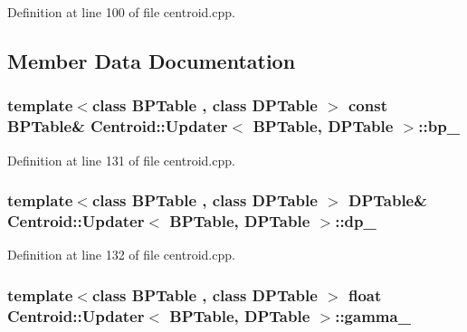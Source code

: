 Definition at line 100 of file centroid.\+cpp.



\subsection{Member Data Documentation}
\hypertarget{struct_centroid_1_1_updater_a9769d7141589366c4e6d031b267c8dc4}{
\subsubsection[{bp\+\_\+}]{\setlength{\rightskip}{0pt plus 5cm}template$<$class B\+P\+Table , class D\+P\+Table $>$ const {\bf B\+P\+Table}\& {\bf Centroid\+::\+Updater}$<$ {\bf B\+P\+Table}, D\+P\+Table $>$\+::bp\+\_\+}}\label{struct_centroid_1_1_updater_a9769d7141589366c4e6d031b267c8dc4}


Definition at line 131 of file centroid.\+cpp.

\hypertarget{struct_centroid_1_1_updater_ad9d56e0acfb53e8a044c674aa9044381}{
\subsubsection[{dp\+\_\+}]{\setlength{\rightskip}{0pt plus 5cm}template$<$class B\+P\+Table , class D\+P\+Table $>$ D\+P\+Table\& {\bf Centroid\+::\+Updater}$<$ {\bf B\+P\+Table}, D\+P\+Table $>$\+::dp\+\_\+}}\label{struct_centroid_1_1_updater_ad9d56e0acfb53e8a044c674aa9044381}


Definition at line 132 of file centroid.\+cpp.

\hypertarget{struct_centroid_1_1_updater_a3dd3233bf978ca8c9b5b7d424120b777}{
\subsubsection[{gamma\+\_\+}]{\setlength{\rightskip}{0pt plus 5cm}template$<$class B\+P\+Table , class D\+P\+Table $>$ float {\bf Centroid\+::\+Updater}$<$ {\bf B\+P\+Table}, D\+P\+Table $>$\+::gamma\+\_\+}}\label{struct_centroid_1_1_updater_a3dd3233bf978ca8c9b5b7d424120b777}


